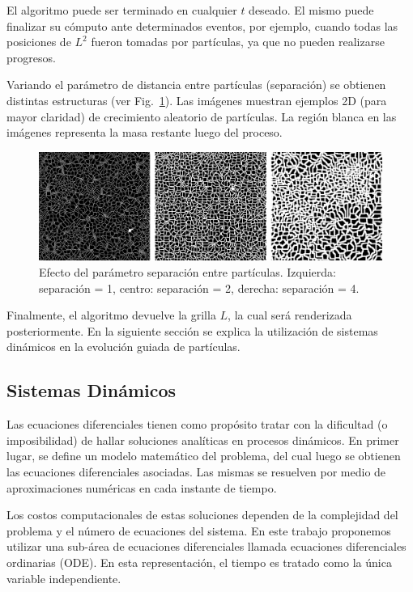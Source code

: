 El algoritmo puede ser terminado en cualquier $t$ deseado. El mismo puede finalizar su c\'omputo ante determinados eventos, por ejemplo, cuando todas las posiciones de $L^{2}$ fueron tomadas por part\'iculas, ya que no pueden realizarse progresos.

Variando el par\'ametro de distancia entre part\'iculas (separación) se obtienen distintas estructuras (ver Fig.~\ref{fg:sistdin1}). Las im\'agenes muestran ejemplos 2D (para mayor claridad) de crecimiento aleatorio de part\'iculas. La regi\'on blanca en las im\'agenes representa la masa restante luego del proceso.


\begin{figure}[htb!]
  \centerline{\includegraphics[width=13cm]{sistdin1}}
  \caption[Efecto del parámetro separación entre partículas.]{Efecto del parámetro separación entre partículas. Izquierda: separaci\'on = 1, centro: separaci\'on = 2, derecha: separaci\'on = 4.}
  \label{fg:sistdin1}
\end{figure}

Finalmente, el algoritmo devuelve la grilla $L$, la cual ser\'a renderizada posteriormente. En la siguiente secci\'on se explica la utilizaci\'on de sistemas din\'amicos en la evoluci\'on guiada de part\'iculas.

\subsection{Sistemas Din\'amicos}

Las ecuaciones diferenciales tienen como prop\'osito tratar con la dificultad (o imposibilidad) de hallar soluciones anal\'iticas en procesos din\'amicos. En primer lugar, se define un modelo matem\'atico del problema, del cual luego se obtienen 
las ecuaciones diferenciales asociadas. Las mismas se resuelven por medio de aproximaciones num\'ericas en cada instante de tiempo.

Los costos computacionales de estas soluciones dependen de la complejidad del problema y el n\'umero de ecuaciones del sistema. En este trabajo proponemos utilizar una sub-\'area de ecuaciones diferenciales llamada ecuaciones diferenciales ordinarias (ODE). En esta representaci\'on, el tiempo es tratado como la \'unica variable independiente.


